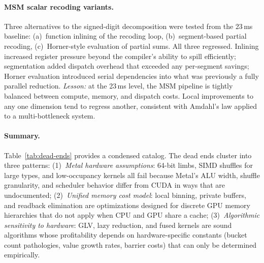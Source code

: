 \paragraph{MSM scalar recoding variants.}
Three alternatives to the signed-digit decomposition were tested from the 23\,ms baseline:
(a)~function inlining of the recoding loop,
(b)~segment-based partial recoding,
(c)~Horner-style evaluation of partial sums.
All three regressed.
Inlining increased register pressure beyond the compiler's ability to spill efficiently; segmentation added dispatch overhead that exceeded any per-segment savings; Horner evaluation introduced serial dependencies into what was previously a fully parallel reduction.
\emph{Lesson:} at the 23\,ms level, the MSM pipeline is tightly balanced between compute, memory, and dispatch costs.
Local improvements to any one dimension tend to regress another, consistent with Amdahl's law applied to a multi-bottleneck system.

\paragraph{Summary.}
Table~\ref{tab:dead-ends} provides a condensed catalog.
The dead ends cluster into three patterns:
(1)~\emph{Metal hardware assumptions}: 64-bit limbs, SIMD shuffles for large types, and low-occupancy kernels all fail because Metal's ALU width, shuffle granularity, and scheduler behavior differ from CUDA in ways that are undocumented;
(2)~\emph{Unified memory cost model}: local binning, private buffers, and readback elimination are optimizations designed for discrete GPU memory hierarchies that do not apply when CPU and GPU share a cache;
(3)~\emph{Algorithmic sensitivity to hardware}: GLV, lazy reduction, and fused kernels are sound algorithms whose profitability depends on hardware-specific constants (bucket count pathologies, value growth rates, barrier costs) that can only be determined empirically.

